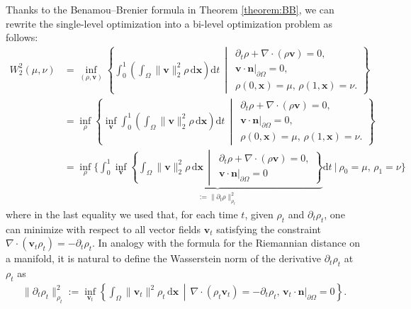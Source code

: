 \documentclass[11pt]{book}
\newcommand{\dx}{\mathrm{d}\mathbf{x}}
\newcommand{\dt}{\mathrm{d}t}
\begin{document}
Thanks to the Benamou--Brenier formula in Theorem \ref{theorem:BB}, we can rewrite the single-level optimization into a bi-level optimization problem as follows:
\begin{align*}
    W_2^2(\mu, \nu) &= \inf_{(\rho, \mathbf{v})} \left\{ \int_0^1 \left( \int_\Omega \|\mathbf{v}\|_2^2 \rho \, \dx \right) \dt \,\middle|\, 
    \begin{array}{ll}
        \partial_t \rho + \nabla\cdot(\rho\mathbf{v}) = 0, \\
        \mathbf{v}\cdot \mathbf{n} |_{\partial \Omega} = 0, \\
        \rho(0,\mathbf{x}) = \mu, \, \rho(1,\mathbf{x}) = \nu.
    \end{array}
    \right\} \\
    &= \inf_{\rho} \left\{ \inf_{\mathbf{v}} \int_0^1 \left( \int_\Omega \|\mathbf{v}\|_2^2 \rho \, \dx \right) \dt \,\middle|\, 
    \begin{array}{l}
        \partial_t \rho + \nabla\cdot(\rho\mathbf{v}) = 0, \\
        \mathbf{v} \cdot \mathbf{n} |_{\partial \Omega} = 0, \\
        \rho(0,\mathbf{x}) = \mu, \, \rho(1,\mathbf{x}) = \nu.
    \end{array}
    \right\} \\
    &= \inf_{\rho} \bigg\{ \int_0^1 \underbrace{\inf_{\mathbf{v}} \left\{ \int_\Omega \|\mathbf{v}\|_2^2 \rho \, \dx \,\middle|\, 
    \begin{array}{l}
        \partial_t \rho + \nabla\cdot(\rho \mathbf{v}) = 0, \\
        \mathbf{v} \cdot \mathbf{n} |_{\partial \Omega} = 0
    \end{array}
    \right\} }_{:=\|\partial_t\rho\|_{\rho_t}^2} \dt\ \bigg| \ \rho_0 = \mu, \, \rho_1 = \nu\bigg\} 
\end{align*}
where in the last equality we used that, for each time \( t \), given \( \rho_t \) and \( \partial_t \rho_t \), one can 
minimize with respect to all vector fields \( \mathbf{v}_t \) satisfying the constraint \(\nabla\cdot(\mathbf{v}_t \rho_t) = -\partial_t \rho_t\). 
In analogy with the formula for the Riemannian distance on a manifold, it is natural to define 
the Wasserstein norm of the derivative \( \partial_t \rho_t \) at \( \rho_t \) as
\begin{align}\label{eqn:Wasserstein_norm}
    \| \partial_t \rho_t \|^2_{\rho_t} := \inf_{\mathbf{v}_t} \left\{ \int_\Omega \|\mathbf{v}_t\|^2 \rho_t \, \dx \,\middle|\,
    \nabla\cdot(\rho_t\mathbf{v}_t) = -\partial_t \rho_t, \, \mathbf{v}_t \cdot \mathbf{n} |_{\partial \Omega} = 0 \right\}.
\end{align}
\end{document}
